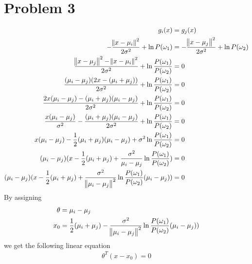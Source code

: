 \documentclass[a4paper, 10pt, twoside]{article}
\begin{document}
\section*{Problem 3}
\begin{align*}
    g_i(x)                                                                                                                             & = g_j(x)                                                \\
    -\frac{\norm{x-\mu_i}^2}{2\sigma^2} + \ln P(\omega_1)                                                                              & = -\frac{\norm{x-\mu_j}^2}{2\sigma^2} + \ln P(\omega_2) \\
    \frac{\norm{x-\mu_j}^2 - \norm{x-\mu_i}^2}{2\sigma^2} + \ln \frac{P(\omega_1)}{P(\omega_2)}                                        & = 0                                                     \\
    \frac{(\mu_i-\mu_j)(2x-(\mu_i+\mu_j))}{2\sigma^2} + \ln \frac{P(\omega_1)}{P(\omega_2)}                                            & = 0                                                     \\
    \frac{2x(\mu_i-\mu_j)-(\mu_i+\mu_j)(\mu_i-\mu_j)}{2\sigma^2} + \ln \frac{P(\omega_1)}{P(\omega_2)}                                 & = 0                                                     \\
    \frac{x(\mu_i-\mu_j)}{\sigma^2}-\frac{(\mu_i+\mu_j)(\mu_i-\mu_j)}{2\sigma^2} + \ln \frac{P(\omega_1)}{P(\omega_2)}                 & = 0                                                     \\
    x(\mu_i-\mu_j)-\frac{1}{2}(\mu_i+\mu_j)(\mu_i-\mu_j) + \sigma^2 \ln \frac{P(\omega_1)}{P(\omega_2)}                                & = 0                                                     \\
    (\mu_i-\mu_j)(x-\frac{1}{2}(\mu_i+\mu_j) + \frac{\sigma^2}{\mu_i-\mu_j} \ln \frac{P(\omega_1)}{P(\omega_2)})                       & = 0                                                     \\
    (\mu_i-\mu_j)(x-\frac{1}{2}(\mu_i+\mu_j) + \frac{\sigma^2}{\norm{\mu_i-\mu_j}^2} \ln \frac{P(\omega_1)}{P(\omega_2)}(\mu_i-\mu_j)) & = 0                                                     \\
\end{align*}
By assigning
\begin{align}
    \theta & = \mu_i-\mu_j                                                                                                        \\
    x_0    & = \frac{1}{2}(\mu_i+\mu_j) - \frac{\sigma^2}{\norm{\mu_i-\mu_j}^2} \ln \frac{P(\omega_1)}{P(\omega_2)}(\mu_i-\mu_j))
\end{align}
we get the following linear equation
\begin{align*}
    \theta^T(x-x_0) = 0
\end{align*}
\end{document}

